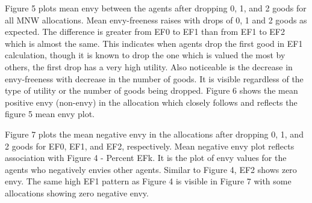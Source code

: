     


Figure 5 plots mean envy between the agents after dropping 0, 1, and 2 goods for all MNW allocations. Mean envy-freeness raises with drops of 0, 1 and 2 goods as expected. The difference is greater from EF0 to EF1 than from EF1 to EF2 which is almost the same. This indicates when agents drop the first good in EF1 calculation, though it is known to drop the one which is valued the most by others, the first drop has a very high utility. Also noticeable is the decrease in envy-freeness with decrease in the number of goods. It is visible regardless of the type of utility or the number of goods being dropped. Figure 6 shows the mean positive envy (non-envy) in the allocation which closely follows and reflects the figure 5 mean envy plot.

Figure 7 plots the mean negative envy in the allocations after dropping 0, 1, and 2 goods for EF0, EF1, and EF2, respectively. Mean negative envy plot reflects association with Figure 4 - Percent EFk. It is the plot of envy values for the agents who negatively envies other agents. Similar to Figure 4, EF2 shows zero envy. The same high EF1 pattern as Figure 4 is visible in Figure 7 with some allocations showing zero negative envy.


